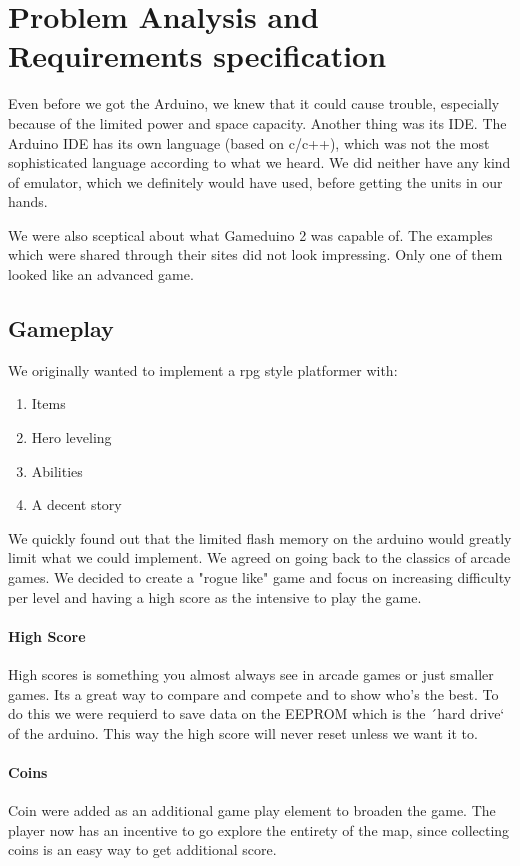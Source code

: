 \chapter{Problem Analysis and Requirements specification}

Even before we got the Arduino, we knew that it could cause trouble,
especially because of the limited power and space capacity. Another thing was its IDE. The Arduino IDE has its own language (based on c/c++), which was not the most
sophisticated language according to what we heard. We did neither have any kind of emulator, which we definitely would have used, before getting the units in our hands.

We were also sceptical about what Gameduino 2 was capable of. The examples
which were shared through their sites did not look impressing. Only one of them
looked like an advanced game.

\section{Gameplay}%
We originally wanted to implement a rpg style platformer with:
\begin{enumerate}
\item Items
\item Hero leveling
\item Abilities
\item A decent story
\end{enumerate}
We quickly found out that the limited flash memory on the arduino would greatly limit what we could implement. We agreed on going back to the classics of arcade games. We decided to create a "rogue like" game and focus on increasing difficulty per level and having a high score as the intensive to play the game.

\subsubsection*{High Score}
High scores is something you almost always see in arcade games or just smaller games. Its a great way to compare and compete and to show who's the best.
To do this we were requierd to save data on the EEPROM which is the ´hard drive` of the arduino. This way the high score will never reset unless we want it to.

\subsubsection*{Coins}
Coin were added as an additional game play element to broaden the game. The player now has an incentive to go explore the entirety of the map, since collecting coins is an easy way to get additional score.
